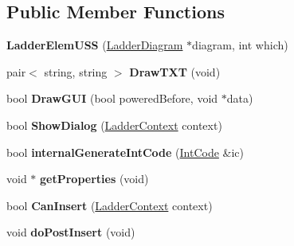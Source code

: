 \subsection*{Public Member Functions}
\begin{DoxyCompactItemize}
\item 
\hypertarget{class_ladder_elem_u_s_s_a7de854ded6f0975fd04d4d06bbb45145}{{\bfseries Ladder\-Elem\-U\-S\-S} (\hyperlink{class_ladder_diagram}{Ladder\-Diagram} $\ast$diagram, int which)}\label{class_ladder_elem_u_s_s_a7de854ded6f0975fd04d4d06bbb45145}

\item 
\hypertarget{class_ladder_elem_u_s_s_a7d7177bf93f9a86c879441890413fce3}{pair$<$ string, string $>$ {\bfseries Draw\-T\-X\-T} (void)}\label{class_ladder_elem_u_s_s_a7d7177bf93f9a86c879441890413fce3}

\item 
\hypertarget{class_ladder_elem_u_s_s_a9b8b333e8e90829f7c97501aa0ac9e6f}{bool {\bfseries Draw\-G\-U\-I} (bool powered\-Before, void $\ast$data)}\label{class_ladder_elem_u_s_s_a9b8b333e8e90829f7c97501aa0ac9e6f}

\item 
\hypertarget{class_ladder_elem_u_s_s_a9a8b8cbe0f048568d595c904102d5fcc}{bool {\bfseries Show\-Dialog} (\hyperlink{struct_ladder_context}{Ladder\-Context} context)}\label{class_ladder_elem_u_s_s_a9a8b8cbe0f048568d595c904102d5fcc}

\item 
\hypertarget{class_ladder_elem_u_s_s_a5f24f96f751426a95f082509a73f38ef}{bool {\bfseries internal\-Generate\-Int\-Code} (\hyperlink{class_int_code}{Int\-Code} \&ic)}\label{class_ladder_elem_u_s_s_a5f24f96f751426a95f082509a73f38ef}

\item 
\hypertarget{class_ladder_elem_u_s_s_a85745edb24427fb54f4d5c46d5cdd2da}{void $\ast$ {\bfseries get\-Properties} (void)}\label{class_ladder_elem_u_s_s_a85745edb24427fb54f4d5c46d5cdd2da}

\item 
\hypertarget{class_ladder_elem_u_s_s_a4e830f8b6dca0c25991243e3f6b5c2a0}{bool {\bfseries Can\-Insert} (\hyperlink{struct_ladder_context}{Ladder\-Context} context)}\label{class_ladder_elem_u_s_s_a4e830f8b6dca0c25991243e3f6b5c2a0}

\item 
\hypertarget{class_ladder_elem_u_s_s_a172fc6877430b44dc87f54842509747f}{void {\bfseries do\-Post\-Insert} (void)}\label{class_ladder_elem_u_s_s_a172fc6877430b44dc87f54842509747f}


\end{DoxyCompactItemize}
